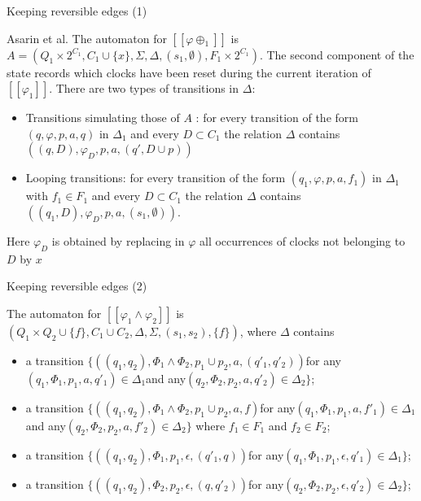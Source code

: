 \begin{frame}[fragile]{Keeping reversible edges (1)}
    \begin{definition}
        Asarin et al.
        The automaton for $[\![\varphi\oplus_1 ]\!]$ is $A = (Q_1 \times 2^{C_1}, C_1 \cup \{x\},\Sigma,\Delta,(s_1,\emptyset),F_1 \times 2^{C_1})$. The second component of the state records which clocks have been reset during the current iteration of $[\![\varphi_1]\!]$.
        There are two types of transitions in $\Delta$:
        \begin{itemize}
            \item Transitions simulating those of $A$ : for every transition of the form $(q,\varphi,p,a,q)$ in $\Delta_1$
            and every $D \subset C_1$ the relation $\Delta$ contains $((q,D),\varphi_D,p,a,(q',D\cup p))$
            \item Looping transitions: for every transition of the form $(q_1,\varphi,p,a, f_1)$ in $\Delta_1$ with $f_1 \in F_1$ and
            every $D \subset C_1$ the relation $\Delta$ contains $((q_1,D),\varphi_D,p,a,(s_1,\emptyset))$.
        \end{itemize}
        Here $\varphi_D$ is obtained by replacing in $\varphi$ all occurrences of clocks not belonging to $D$ by $x$
    \end{definition}
\end{frame}
\begin{frame}[fragile]{Keeping reversible edges (2)}
    \begin{definition}
        The automaton for $[\![\varphi_1\wedge\varphi_2]\!]$ is $(Q_1\times Q_2 \cup \{f\}, C_1\cup C_2,\Delta,\Sigma,(s_1,s_2),\{f\})$, where $\Delta$ contains
        \begin{itemize}
            \item a transition $\{((q_1,q_2),\Phi_1\wedge\Phi_2,p_1\cup p_2, a, (q'_1,q'_2))$for any$(q_1,\Phi_1,p_1,a,q'_1)\in\Delta_1$and any$(q_2,\Phi_2,p_2,a,q'_2)\in\Delta_2\}$;
            \item a transition $\{((q_1,q_2),\Phi_1\wedge\Phi_2,p_1\cup p_2, a, f)$for any$(q_1,\Phi_1,p_1,a,f'_1)\in\Delta_1$and any$(q_2,\Phi_2,p_2,a,f'_2)\in\Delta_2\}$ where $f_1\in F_1$ and $f_2\in F_2$;
            \item a transition $\{((q_1,q_2),\Phi_1,p_1,\epsilon,(q'_1,q))$for any$(q_1,\Phi_1,p_1,\epsilon,q'_1)\in\Delta_1\}$;
            \item a transition $\{((q_1,q_2),\Phi_2,p_2,\epsilon,(q,q'_2))$for any$(q_2,\Phi_2,p_2,\epsilon,q'_2)\in\Delta_2\}$;
        \end{itemize}
    \end{definition}

        
\end{frame}

